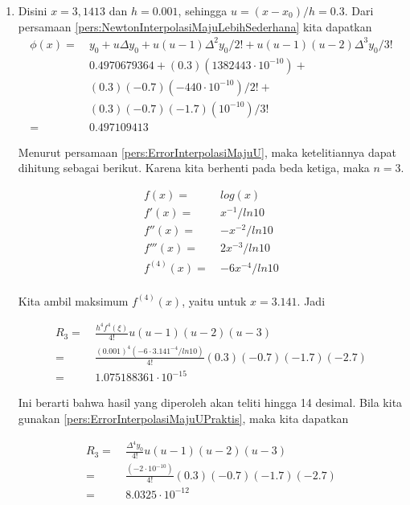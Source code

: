 \begin{enumerate}
\item Disini $x=3,1413$ dan $h = 0.001$, sehingga $u = (x-x_0)/h = 0.3$. Dari persamaan \ref{pers:NewtonInterpolasiMajuLebihSederhana} kita dapatkan
	\begin{equation*}
	\begin{split}
	\phi(x) =~& y_0 + u\Delta y_0 + u(u-1)\Delta^2y_0/2! + u(u-1)(u-2)\Delta^3y_0/3!\\
	& 0.4970679364 + (0.3)(1382443\cdot10^{-10}) +\\
	& (0.3)(-0.7)(-440\cdot10^{-10})/2!+\\
	& (0.3)(-0.7)(-1.7)(10^{-10})/3!\\
	=~& 0.497109413
	\end{split}
	\end{equation*}

	Menurut persamaan \ref{pers:ErrorInterpolasiMajuU}, maka ketelitiannya dapat dihitung sebagai berikut. Karena kita berhenti pada beda ketiga, maka $n=3$.

	\begin{equation*}
	\begin{split}
	f(x) =~& log(x)\\
	f'(x) =~& x^{-1}/ln 10\\
	f''(x) =~& -x^{-2}/ln 10\\
	f'''(x) =~& 2x^{-3}/ln 10\\
	f^{(4)}(x) =~& -6x^{-4}/ln 10\\
	\end{split}
	\end{equation*}

	Kita ambil maksimum $f^{(4)}(x)$, yaitu untuk $x=3.141$. Jadi

	\begin{equation*}
	\begin{split}
	R_3 =~& \frac{h^4f^{4}(\xi)}{4!} u(u-1)(u-2)(u-3)\\
		=~& \frac{(0.001)^4(-6\cdot3.141^{-4}/ln 10)}{4!}(0.3)(-0.7)(-1.7)(-2.7)\\
		=~& 1.075188361\cdot10^{-15}
	\end{split}
	\end{equation*}

	Ini berarti bahwa hasil yang diperoleh akan teliti hingga 14 desimal. Bila kita gunakan \ref{pers:ErrorInterpolasiMajuUPraktis}, maka kita dapatkan 

	\begin{equation*}
	\begin{split}
	R_3 =~& \frac{\Delta^4 y_0}{4!}u(u-1)(u-2)(u-3)\\
	=~& \frac{(-2\cdot10^{-10})}{4!}(0.3)(-0.7)(-1.7)(-2.7)\\
	=~& 8.0325 \cdot 10^{-12}
	\end{split}
	\end{equation*}


\end{enumerate}
